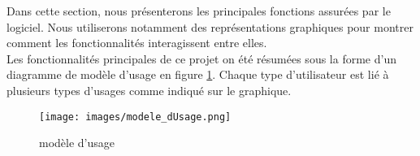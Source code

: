 Dans cette section, nous présenterons les principales fonctions assurées par le logiciel. Nous utiliserons notamment des représentations graphiques pour montrer comment les fonctionnalités interagissent entre elles.\\




Les fonctionnalités principales de ce projet on été résumées sous la forme d'un diagramme de modèle d'usage en figure \ref{mod_use}. Chaque type d'utilisateur est lié à plusieurs types d'usages comme indiqué sur le graphique.

\begin{figure}[h!]
	\centering
	\texttt{[image: images/modele\_dUsage.png]}
	\caption{\label{mod_use} modèle d'usage}
\end{figure}
